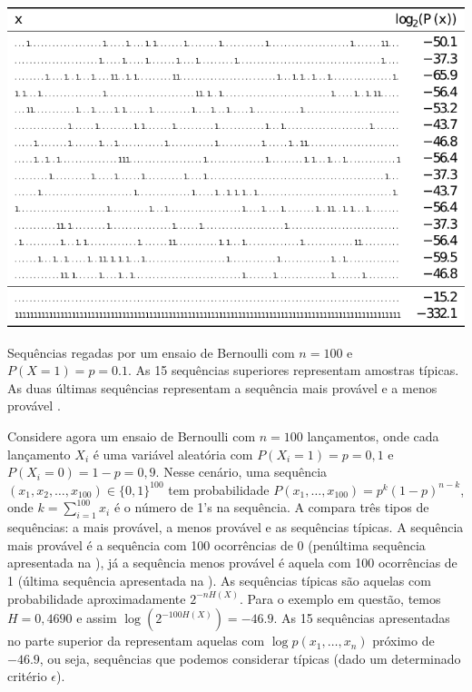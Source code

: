 \begin{marginfigure}%
  \includegraphics[width=\linewidth]{figures/seq100mackay.pdf}
  \caption{Sequências regadas por um ensaio de Bernoulli com $n=100$ e $P(X=1) = p = 0.1$.
        As 15 sequências superiores representam amostras típicas. As duas últimas sequências
        representam a sequência mais provável e a menos provável \parencite{mackay2003}.}
  \label{fig:seq100mackay}
\end{marginfigure}

Considere agora um ensaio de Bernoulli com $n = 100$ lançamentos, onde cada
lançamento $X_i$ é uma variável aleatória com $P(X_i = 1) = p = 0,1$ e
$P(X_i = 0) = 1-p = 0,9$. Nesse cenário, uma sequência 
$(x_1, x_2, \ldots, x_{100}) \in \{0,1\}^{100}$ tem probabilidade 
$P(x_1, \ldots, x_{100}) = p^k (1-p)^{n-k}$, onde $k = \sum_{i=1}^{100} x_i$ 
é o número de 1's na sequência. A  compara três tipos
de sequências: a mais provável, a menos provável e as sequências típicas.
A sequência mais provável é a sequência com 100 ocorrências de 0 (penúltima sequência
apresentada na ), já a sequência menos provável é aquela 
com 100 ocorrências de 1 (última sequência apresentada na ).
As sequências típicas são aquelas com probabilidade aproximadamente $2^{-nH(X)}$.
Para o exemplo em questão, temos $H = 0,4690$ e assim $\log (2^{-100 H(X)}) = -46.9$.
As 15 sequências apresentadas no parte superior da  representam
aquelas com $\log p(x_1,\ldots,x_n)$ próximo de $-46.9$, ou seja, sequências que
podemos considerar típicas (dado um determinado critério $\epsilon$).


